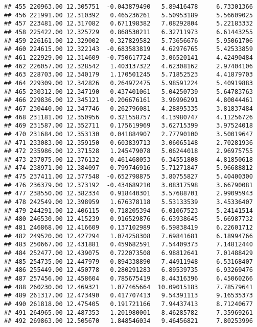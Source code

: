 \documentclass[
]{article}
\begin{document}
\begin{verbatim}
## 455 220963.00 12.305751  -0.043879490   5.89416478     6.73301366
## 456 221991.00 12.310392   0.465236261   5.50953189     5.56609025
## 457 223481.00 12.317082   0.671198382   7.08292804     5.22183332
## 458 225422.00 12.325729   0.868530211   6.32711973     6.61443255
## 459 226161.00 12.329002   0.327829582   5.73656676     5.95061706
## 460 224615.00 12.322143  -0.683583819   4.62976765     5.42533859
## 461 222929.00 12.314609  -0.750617724   3.06520141     4.42490484
## 462 226057.00 12.328542   1.403137322   4.62308162     2.97404106
## 463 228703.00 12.340179   1.170501245   5.71852523     4.41879703
## 464 229309.00 12.342826   0.264972475   5.98591224     5.40919883
## 465 230312.00 12.347190   0.437401061   5.04250739     5.64783763
## 466 229836.00 12.345121  -0.206676161   3.96996291     4.80044461
## 467 230440.00 12.347746   0.262796081   4.28895335     3.81837484
## 468 231181.00 12.350956   0.321558757   4.13980747     4.11256726
## 469 231587.00 12.352711   0.175619969   3.62715399     3.97524018
## 470 231684.00 12.353130   0.041884907   2.77790100     3.50019647
## 471 233083.00 12.359150   0.603839713   3.06065148     2.70281936
## 472 235986.00 12.371528   1.245479078   5.06244018     2.96975755
## 473 237075.00 12.376132   0.461468053   6.34551808     4.81850618
## 474 238971.00 12.384097   0.799746916   5.71271847     5.96688812
## 475 237411.00 12.377548  -0.652798875   3.80755827     5.40400300
## 476 236379.00 12.373192  -0.434689210   3.08317598     3.66790081
## 477 238550.00 12.382334   0.918440301   3.57688701     2.99095943
## 478 242549.00 12.398959   1.676378118   5.53133539     3.45336407
## 479 244291.00 12.406115   0.718205394   6.01067523     5.24141514
## 480 246530.00 12.415239   0.916529876   6.63938645     5.66987732
## 481 246868.00 12.416609   0.137102989   6.59838419     6.22601712
## 482 249520.00 12.427294   1.074258308   7.69841681     6.18994766
## 483 250667.00 12.431881   0.459682591   7.54409373     7.14812440
## 484 252477.00 12.439075   0.722073508   6.98812641     7.01488429
## 485 254735.00 12.447979   0.894338890   7.44911948     6.53168407
## 486 255449.00 12.450778   0.280291283   6.89539735     6.93269476
## 487 257456.00 12.458604   0.785675419   8.44316396     6.45060266
## 488 260230.00 12.469321   1.077465664  10.09015183     7.78579641
## 489 261317.00 12.473490   0.417707413   9.54391113     9.16535373
## 490 261818.00 12.475405   0.191721166   7.94437413     8.71240677
## 491 264965.00 12.487353   1.201980001   8.46285782     7.35969261
## 492 269863.00 12.505670   1.848546034   9.46456821     7.80253996

\end{verbatim}
\end{document}
